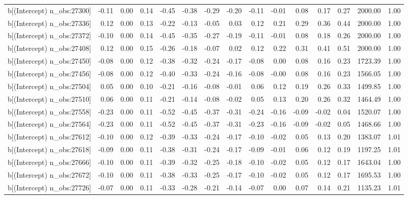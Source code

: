 \begin{table}[ht]
\begin{tabular}{rrrrrrrrrrrrrrr}
  b[(Intercept) n\_obs:27300] & -0.11 & 0.00 & 0.14 & -0.45 & -0.38 & -0.29 & -0.20 & -0.11 & -0.01 & 0.08 & 0.17 & 0.27 & 2000.00 & 1.00 \\ 
  b[(Intercept) n\_obs:27336] & 0.12 & 0.00 & 0.13 & -0.22 & -0.13 & -0.05 & 0.03 & 0.12 & 0.21 & 0.29 & 0.36 & 0.44 & 2000.00 & 1.00 \\ 
  b[(Intercept) n\_obs:27372] & -0.10 & 0.00 & 0.14 & -0.45 & -0.35 & -0.27 & -0.19 & -0.11 & -0.01 & 0.08 & 0.18 & 0.26 & 2000.00 & 1.00 \\ 
  b[(Intercept) n\_obs:27408] & 0.12 & 0.00 & 0.15 & -0.26 & -0.18 & -0.07 & 0.02 & 0.12 & 0.22 & 0.31 & 0.41 & 0.51 & 2000.00 & 1.00 \\ 
  b[(Intercept) n\_obs:27450] & -0.08 & 0.00 & 0.12 & -0.38 & -0.32 & -0.24 & -0.17 & -0.08 & 0.00 & 0.08 & 0.16 & 0.23 & 1723.39 & 1.00 \\ 
  b[(Intercept) n\_obs:27456] & -0.08 & 0.00 & 0.12 & -0.40 & -0.33 & -0.24 & -0.16 & -0.08 & -0.00 & 0.08 & 0.16 & 0.23 & 1566.05 & 1.00 \\ 
  b[(Intercept) n\_obs:27504] & 0.05 & 0.00 & 0.10 & -0.21 & -0.16 & -0.08 & -0.01 & 0.06 & 0.12 & 0.19 & 0.26 & 0.33 & 1499.85 & 1.00 \\ 
  b[(Intercept) n\_obs:27510] & 0.06 & 0.00 & 0.11 & -0.21 & -0.14 & -0.08 & -0.02 & 0.05 & 0.13 & 0.20 & 0.26 & 0.32 & 1464.49 & 1.00 \\ 
  b[(Intercept) n\_obs:27558] & -0.23 & 0.00 & 0.11 & -0.52 & -0.45 & -0.37 & -0.31 & -0.24 & -0.16 & -0.09 & -0.02 & 0.04 & 1520.07 & 1.00 \\ 
  b[(Intercept) n\_obs:27564] & -0.23 & 0.00 & 0.11 & -0.52 & -0.45 & -0.37 & -0.31 & -0.23 & -0.16 & -0.09 & -0.02 & 0.05 & 1468.66 & 1.00 \\ 
  b[(Intercept) n\_obs:27612] & -0.10 & 0.00 & 0.12 & -0.39 & -0.33 & -0.24 & -0.17 & -0.10 & -0.02 & 0.05 & 0.13 & 0.20 & 1383.07 & 1.01 \\ 
  b[(Intercept) n\_obs:27618] & -0.09 & 0.00 & 0.11 & -0.38 & -0.31 & -0.24 & -0.17 & -0.09 & -0.01 & 0.06 & 0.12 & 0.19 & 1197.25 & 1.01 \\ 
  b[(Intercept) n\_obs:27666] & -0.10 & 0.00 & 0.11 & -0.39 & -0.32 & -0.25 & -0.18 & -0.10 & -0.02 & 0.05 & 0.12 & 0.17 & 1643.04 & 1.00 \\ 
  b[(Intercept) n\_obs:27672] & -0.10 & 0.00 & 0.11 & -0.38 & -0.33 & -0.25 & -0.17 & -0.10 & -0.02 & 0.05 & 0.12 & 0.17 & 1695.53 & 1.00 \\ 
  b[(Intercept) n\_obs:27726] & -0.07 & 0.00 & 0.11 & -0.33 & -0.28 & -0.21 & -0.14 & -0.07 & 0.00 & 0.07 & 0.14 & 0.21 & 1135.23 & 1.01 \\ 

\end{tabular}
\end{table}

